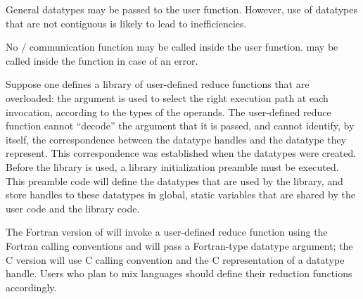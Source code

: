General datatypes may be passed to the user function.
However, use of datatypes that are not contiguous is likely to lead to
inefficiencies.

No \MPI/ communication function may be called inside the user function.
 may be called inside the
function in case of an error.

\begin{users}
Suppose one defines a library of user-defined reduce
functions that are overloaded: the  argument is used
to select the right execution path at each invocation, according to
the types of the operands.
The user-defined reduce function cannot ``decode'' the
 argument that it is passed, and cannot identify,
by itself, the correspondence between the datatype handles and the datatype
they represent.  This correspondence was established when the datatypes
were created.  Before the library is used, a library initialization
preamble must be executed.  This preamble code will define the
datatypes that are used by the library, and store handles to these
datatypes in global, static variables that are shared by the user code and the
library code.

The Fortran version of  will invoke a user-defined reduce
function using the Fortran calling conventions and will pass a Fortran-type
datatype argument;  the C version will use C calling convention and the C
representation of a datatype handle.  Users who plan to mix languages should
define their reduction functions accordingly.
\end{users}



